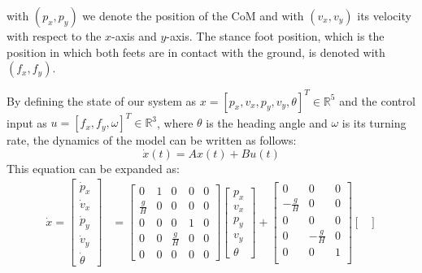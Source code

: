 with $(p_{x}, p_{y})$ we denote the position of the CoM and with $(v_{x}, v_{y})$ its velocity with respect to the $x$-axis and $y$-axis. The stance foot position, which is the position in which both feets are in contact with the ground, is denoted with $(f_{x}, f_{y})$.

By defining the state of our system as $x = [p_{x}, v_{x}, p_{y}, v_{y}, \theta]^T \in \mathbb{R}^5$ and the control input as $u = [f_{x}, f_{y}, \omega]^T \in \mathbb{R}^3$, where $\theta$ is the heading angle and $\omega$ is its turning rate, the dynamics of the model can be written as follows:
\begin{equation}
    \dot{x}(t) = A x(t) + B u(t)
\end{equation}
This equation can be expanded as:
\begin{align}
    \dot{x} = 
    \begin{bmatrix}
        \dot{p}_{x}\\
        \dot{v}_{x}\\
        \dot{p}_{y}\\
        \dot{v}_{y}\\
        \dot{\theta}
    \end{bmatrix}
    &=
    \begin{bmatrix}
        0 & 1 & 0 & 0 & 0 \\[1ex]
        \frac{g}{H} & 0 & 0 & 0 & 0 \\[1ex]
        0 & 0 & 0 & 1 & 0 \\[1ex]
        0 & 0 & \frac{g}{H} & 0 & 0 \\[1ex]
        0 & 0 & 0 & 0 & 0
    \end{bmatrix}
    \begin{bmatrix}
        p_{x}\\
        v_{x}\\
        p_{y}\\
        v_{y}\\
        \theta
    \end{bmatrix}
    +
    \begin{bmatrix}
        0 & 0 & 0 \\[1ex]
        -\frac{g}{H} & 0 & 0 \\[1ex]
        0 & 0 & 0 \\[1ex]
        0 & -\frac{g}{H} & 0 \\[1ex]
        0 & 0 & 1 \\[1ex]
    \end{bmatrix}
    \begin{bmatrix}

\end{bmatrix}
\end{align}
